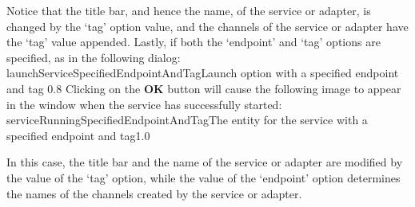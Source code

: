 Notice that the title bar, and hence the name, of the service or adapter, is changed by
the `tag' option value, and the channels of the service or adapter have the `tag' value
appended.
Lastly, if both the `endpoint' and `tag' options are specified, as in the following
dialog:
%
{launchServiceSpecifiedEndpointAndTag}{Launch option with a specified endpoint and tag}%
{0.8}
\condPage{}
Clicking on the \textbf{OK} button will cause the following image to appear in the
\emph{\MMMU} window when the service has successfully started:
%
{serviceRunningSpecifiedEndpointAndTag}{The \emph{\MMMU} entity for the service with a
specified endpoint and tag}{1.0}

In this case, the title bar and the name of the service or adapter are modified by the
value of the `tag' option, while the value of the `endpoint' option determines the names
of the \yarp{} channels created by the service or adapter.
\appendixEnd{}
